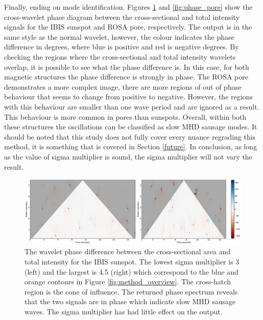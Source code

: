 	Finally, ending on mode identification.
	Figures \ref{fig:phase_sunspot} and \ref{fig:phase_pore} show the cross-wavelet phase diagram between the cross-sectional and total intensity signals for the IBIS sunspot and ROSA pore, respectively.
	The output is in the same style as the normal wavelet, however, the colour indicates the phase difference in degrees, where blue is positive and red is negative degrees.
	By checking the regions where the cross-sectional and total intensity wavelets overlap, it is possible to see what the phase difference is.
	In this case, for both magnetic structures the phase difference is strongly in phase. 
	The ROSA pore demonstrates a more complex image, there are more regions of out of phase behaviour that seems to change from positive to negative.
	However, the regions with this behaviour are smaller than one wave period and are ignored as a result.    
	This behaviour is more common in pores than sunspots.
	Overall, within both these structures the oscillations can be classified as slow MHD sausage modes. 
	It should be noted that this study does not fully cover every nuance regrading this method, it is something that is covered in Section \ref{future}.   
	In conclusion, as long as the value of sigma multiplier is sound, the sigma multiplier will not vary the result.
	    
	\begin{figure}
    	\centering
    	\includegraphics[width=1\textwidth]{sunspot_phase.pdf}
    	\caption{
			            The wavelet phase difference between the cross-sectional area and total intensity for the IBIS sunspot.
			            The lowest sigma multiplier is 3 (left) and the largest is 4.5 (right) which correspond to the blue and orange contours in Figure \ref{fig:method_overview}.
			            The cross-hatch region is the cone of influence.
						The returned phase spectrum reveals that the two signals are in phase which indicate slow MHD sausage waves.
						The sigma multiplier has had little effect on the output.
    	             }
    	\label{fig:phase_sunspot}
    \end{figure}
 
